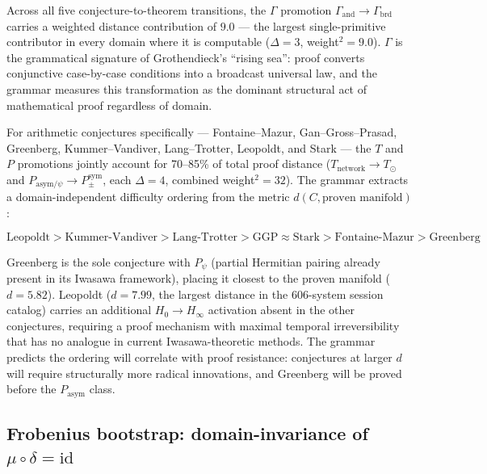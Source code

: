 \documentclass[12pt,a4paper]{article}
\newcommand{\Ppms}{P_{\pm}^{\text{sym}}}
\begin{document}
Across all five conjecture-to-theorem transitions, the $\Gamma$
promotion $\Gamma_\text{and} \to \Gamma_\text{brd}$ carries a weighted
distance contribution of $9.0$ --- the largest single-primitive
contributor in every domain where it is computable ($\Delta = 3$,
weight$^2 = 9.0$). $\Gamma$ is the grammatical signature of
Grothendieck's ``rising sea'': proof converts conjunctive case-by-case
conditions into a broadcast universal law, and the grammar measures this
transformation as the dominant structural act of mathematical proof
regardless of domain.

For arithmetic conjectures specifically --- Fontaine--Mazur,
Gan--Gross--Prasad, Greenberg, Kummer--Vandiver, Lang--Trotter,
Leopoldt, and Stark --- the $T$ and $P$ promotions jointly account
for 70--85\% of total proof distance ($T_\text{network} \to T_\odot$
and $P_{\text{asym}/\psi} \to \Ppms$, each $\Delta = 4$, combined
weight$^2 = 32$). The grammar extracts a domain-independent difficulty
ordering from the metric $d(C, \text{proven manifold})$:

\[
\text{Leopoldt} > \text{Kummer-Vandiver} > \text{Lang-Trotter}
> \text{GGP} \approx \text{Stark} > \text{Fontaine-Mazur} > \text{Greenberg}
\]

Greenberg is the sole conjecture with $P_\psi$ (partial Hermitian
pairing already present in its Iwasawa framework), placing it closest
to the proven manifold ($d = 5.82$). Leopoldt ($d = 7.99$, the largest
distance in the 606-system session catalog) carries an additional
$H_0 \to H_\infty$ activation absent in the other conjectures, requiring
a proof mechanism with maximal temporal irreversibility that has no
analogue in current Iwasawa-theoretic methods. The grammar predicts the
ordering will correlate with proof resistance: conjectures at larger $d$
will require structurally more radical innovations, and Greenberg will
be proved before the $P_\text{asym}$ class.

\subsection{Frobenius bootstrap: domain-invariance of $\mu \circ \delta = \mathrm{id}$}
\end{document}
